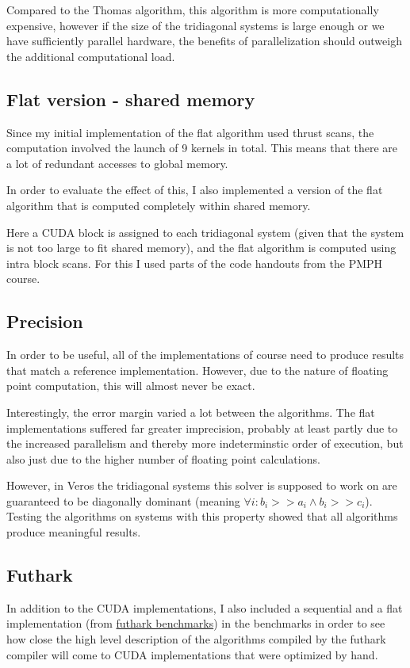\documentclass[a4paper,oneside]{memoir}
\begin{document}
Compared to the Thomas algorithm, this algorithm is more computationally expensive, however if the size of the tridiagonal systems is large enough or we have sufficiently parallel hardware, the benefits of parallelization should outweigh the additional computational load.

\subsection{Flat version - shared memory}
Since my initial implementation of the flat algorithm used thrust scans, the computation involved the launch of 9 kernels in total. This means that there are a lot of redundant accesses to global memory. 

In order to evaluate the effect of this, I also implemented a version of the flat algorithm that is computed completely within shared memory.

Here a CUDA block is assigned to each tridiagonal system (given that the system is not too large to fit shared memory), and the flat algorithm is computed using intra block scans. For this I used parts of the code handouts from the PMPH course.


\subsection{Precision}
In order to be useful, all of the implementations of course need to produce results that match a reference implementation. However, due to the nature of floating point computation, this will almost never be exact.

Interestingly, the error margin varied a lot between the algorithms. The flat implementations suffered far greater imprecision, probably at least partly due to the increased parallelism and thereby more indeterminstic order of execution, but also just due to the higher number of floating point calculations.

However, in Veros the tridiagonal systems this solver is supposed to work on are guaranteed to be diagonally dominant (meaning $\forall i: b_i >> a_i \land b_i >> c_i$). Testing the algorithms on systems with this property showed that all algorithms produce meaningful results.
\subsection{Futhark}
In addition to the CUDA implementations, I also included a sequential and a flat implementation (from \href{https://github.com/diku-dk/futhark-benchmarks/blob/bf5112d0841866dc7370586f2e2a7b48467d2d97/finpar/LocVolCalib.fut}{futhark benchmarks}) in the benchmarks in order to see how close the high level description of the algorithms compiled by the futhark compiler will come to CUDA implementations that were optimized by hand.
\end{document}

